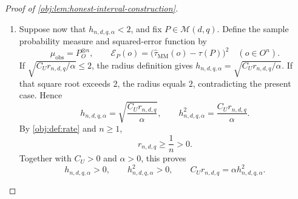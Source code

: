 \begin{proof}[Proof of \cref{obj:lem:honest-interval-construction}]
\begin{enumerate}
For the remaining branch, define the Poisson weights and conditional stream averages by
\[
\omega_N=e^{-n/2}\frac{(n/2)^N}{N!}
\quad(N\in\mathbb N_0),
\]
\[
\overline\tau_N(o)
=
\frac{1}{4^N}
\sum_{\boldsymbol\zeta\in\{1,2,3,4\}^N}
\widetilde\tau(o;N,\boldsymbol\zeta)
\quad(0\le N\le n,\ o\in O^n),
\]
where \(\widetilde\tau(o;N,\boldsymbol\zeta)\) is the projected randomized estimate in \cref{obj:def:mm-estimator} with count \(N\) and stream assignment \(\boldsymbol\zeta\). There are \(4^N\) assignments, including one empty assignment when \(N=0\), and each estimate lies in \([-1,1]\). Therefore
\[
-4^N
\le
\sum_{\boldsymbol\zeta\in\{1,2,3,4\}^N}
\widetilde\tau(o;N,\boldsymbol\zeta)
\le4^N,
\qquad
-1\le\overline\tau_N(o)\le1.
\]
Moreover,
\[
\omega_N\ge0,\qquad
\sum_{N=0}^{\infty}\omega_N
=e^{-n/2}e^{n/2}=1,
\qquad
\sum_{N=0}^{n}\omega_N\le1.
\]
Since the randomized estimate equals zero when \(N>n\), this branch satisfies
\[
\widehat\tau_{\mathrm{MM}}(o)
=\sum_{N=0}^{n}\omega_N\overline\tau_N(o).
\]
Multiplying the stream-average bounds by the nonnegative weights and summing gives
\[
-1
\le-\sum_{N=0}^{n}\omega_N
\le\widehat\tau_{\mathrm{MM}}(o)
\le\sum_{N=0}^{n}\omega_N
\le1.
\]

In particular, if \(h_{n,d,q,\alpha}=2\), the target and estimator ranges imply
\[
\widehat\tau_{\mathrm{MM}}(o)-2\le-1\le\tau(P),
\qquad
\tau(P)\le1\le\widehat\tau_{\mathrm{MM}}(o)+2.
\]
Taking the maximum in the lower endpoint and the minimum in the upper endpoint yields
\[
L(o)\le\tau(P)\le U(o)
\qquad(P\in\mathcal M(d,q),\ o\in O^n).
\]

\item Suppose now that \(h_{n,d,q,\alpha}<2\), and fix \(P\in\mathcal M(d,q)\). Define the sample probability measure and squared-error function by
\[
\mu_{\mathrm{obs}}=P_O^{\otimes n},
\qquad
\mathcal E_P(o)
=\bigl(\widehat\tau_{\mathrm{MM}}(o)-\tau(P)\bigr)^2
\quad(o\in O^n).
\]
If \(\sqrt{C_Ur_{n,d,q}/\alpha}\le2\), the radius definition gives
\(h_{n,d,q,\alpha}=\sqrt{C_Ur_{n,d,q}/\alpha}\).
If that square root exceeds \(2\), the radius equals \(2\), contradicting the present case. Hence
\[
h_{n,d,q,\alpha}
=\sqrt{\frac{C_Ur_{n,d,q}}{\alpha}},
\qquad
h_{n,d,q,\alpha}^2=\frac{C_Ur_{n,d,q}}{\alpha}.
\]
By \cref{obj:def:rate} and \(n\ge1\),
\[
r_{n,d,q}\ge\frac1n>0.
\]
Together with \(C_U>0\) and \(\alpha>0\), this proves
\[
h_{n,d,q,\alpha}>0,
\qquad
h_{n,d,q,\alpha}^2>0,
\qquad
C_Ur_{n,d,q}=\alpha h_{n,d,q,\alpha}^2.
\]


\end{enumerate}
\end{proof}

